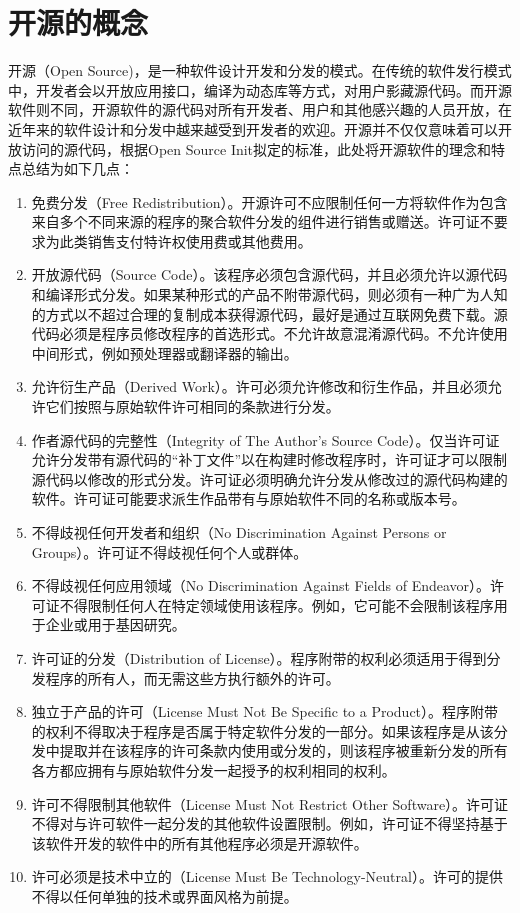 \documentclass[UTF8]{ctexart}
\begin{document}
\section{开源的概念}
开源（Open Source)，是一种软件设计开发和分发的模式。在传统的软件发行模式中，开发者会以开放应用接口，编译为动态库等方式，对用户影藏源代码。而开源软件则不同，开源软件的源代码对所有开发者、用户和其他感兴趣的人员开放，在近年来的软件设计和分发中越来越受到开发者的欢迎。开源并不仅仅意味着可以开放访问的源代码，根据Open Source Init拟定的标准，此处将开源软件的理念和特点总结为如下几点\cite{opensourceinit}：
\begin{enumerate}
    \item 免费分发（Free Redistribution）。开源许可不应限制任何一方将软件作为包含来自多个不同来源的程序的聚合软件分发的组件进行销售或赠送。许可证不要求为此类销售支付特许权使用费或其他费用。
    \item 开放源代码（Source Code）。该程序必须包含源代码，并且必须允许以源代码和编译形式分发。如果某种形式的产品不附带源代码，则必须有一种广为人知的方式以不超过合理的复制成本获得源代码，最好是通过互联网免费下载。源代码必须是程序员修改程序的首选形式。不允许故意混淆源代码。不允许使用中间形式，例如预处理器或翻译器的输出。
    \item 允许衍生产品（Derived Work）。许可必须允许修改和衍生作品，并且必须允许它们按照与原始软件许可相同的条款进行分发。
    \item 作者源代码的完整性（Integrity of The Author's Source Code）。仅当许可证允许分发带有源代码的“补丁文件”以在构建时修改程序时，许可证才可以限制源代码以修改的形式分发。许可证必须明确允许分发从修改过的源代码构建的软件。许可证可能要求派生作品带有与原始软件不同的名称或版本号。
    \item 不得歧视任何开发者和组织（No Discrimination Against Persons or Groups）。许可证不得歧视任何个人或群体。
    \item 不得歧视任何应用领域（No Discrimination Against Fields of Endeavor）。许可证不得限制任何人在特定领域使用该程序。例如，它可能不会限制该程序用于企业或用于基因研究。
    \item 许可证的分发（Distribution of License）。程序附带的权利必须适用于得到分发程序的所有人，而无需这些方执行额外的许可。
    \item 独立于产品的许可（License Must Not Be Specific to a Product）。程序附带的权利不得取决于程序是否属于特定软件分发的一部分。如果该程序是从该分发中提取并在该程序的许可条款内使用或分发的，则该程序被重新分发的所有各方都应拥有与原始软件分发一起授予的权利相同的权利。
    \item 许可不得限制其他软件（License Must Not Restrict Other Software）。许可证不得对与许可软件一起分发的其他软件设置限制。例如，许可证不得坚持基于该软件开发的软件中的所有其他程序必须是开源软件。
    \item 许可必须是技术中立的（License Must Be Technology-Neutral）。许可的提供不得以任何单独的技术或界面风格为前提。
\end{enumerate}
\end{document}

